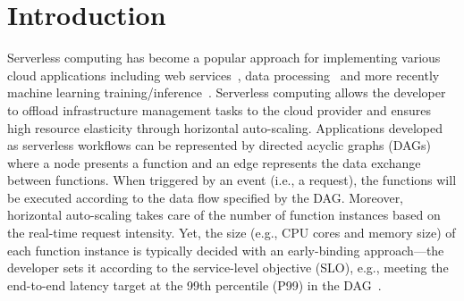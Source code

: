 \section{Introduction}
Serverless computing has become a popular approach for implementing various cloud applications including web services~\cite{asplos23-beehive}, data processing~\cite{socc21-llama,arxiv22-pheromone} and more recently machine learning training/inference~\cite{socc21-morphling,atc21-infaas}. Serverless computing allows the developer to offload infrastructure management tasks to the cloud provider and ensures high resource elasticity through horizontal auto-scaling. Applications developed as serverless workflows can be represented by directed acyclic graphs (DAGs) where a node presents a function and an edge represents the data exchange between functions. When triggered by an event (i.e., a request), the functions will be executed according to the data flow specified by the DAG. 
Moreover, horizontal auto-scaling takes care of the number of function instances based on the real-time request intensity. Yet, the size (e.g., CPU cores and memory size) of each function instance is typically decided with an early-binding approach---the developer sets it according to the service-level objective (SLO), e.g., meeting the end-to-end latency target at the 99th percentile (P99) in the DAG~\cite{osdi22-orion,mac22-wisefuse}.


